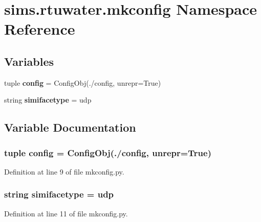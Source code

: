 \section{sims.\+rtuwater.\+mkconfig Namespace Reference}
\label{namespacesims_1_1rtuwater_1_1mkconfig}
\subsection*{Variables}
\begin{DoxyCompactItemize}
\item 
tuple {\bf config} = Config\+Obj(\textquotesingle{}./config\textquotesingle{}, unrepr=True)
\item 
string {\bf simifacetype} = \textquotesingle{}udp\textquotesingle{}
\end{DoxyCompactItemize}


\subsection{Variable Documentation}
\subsubsection[{config}]{\setlength{\rightskip}{0pt plus 5cm}tuple config = Config\+Obj(\textquotesingle{}./config\textquotesingle{}, unrepr=True)}\label{namespacesims_1_1rtuwater_1_1mkconfig_ad5f91786d7c873886a576621a2c1b0b5}


Definition at line 9 of file mkconfig.\+py.

\subsubsection[{simifacetype}]{\setlength{\rightskip}{0pt plus 5cm}string simifacetype = \textquotesingle{}udp\textquotesingle{}}\label{namespacesims_1_1rtuwater_1_1mkconfig_a7f5f5e89422cd15dfc1af6d7593d69c7}


Definition at line 11 of file mkconfig.\+py.


